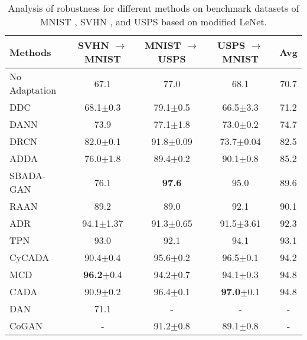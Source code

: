 \documentclass[letterpaper]{article} \usepackage{aaai20}  \usepackage{times}  \usepackage{helvet} \usepackage{courier}  \usepackage[hyphens]{url}  \usepackage{graphicx} \urlstyle{rm} \def\UrlFont{\rm}  \usepackage{graphicx}  \frenchspacing  \setlength{\pdfpagewidth}{8.5in}  \setlength{\pdfpageheight}{11in}
\begin{document}
\begin{table*}
	\caption{Analysis of robustness for different methods on benchmark datasets of MNIST \cite{mnist}, SVHN \cite{svhn}, and USPS \cite{usps} based on modified LeNet.}
	\label{table:results_digits} 
	\begin{center}
		\begin{tabular}{lcccc}
			\hline
			Methods                 & SVHN $\rightarrow$ MNIST & MNIST $\rightarrow$ USPS & USPS $\rightarrow$ MNIST & Avg \\
			\hline
			No Adaptation           & 67.1 & 77.0 & 68.1 & 70.7 \\ 

			DDC \cite{ddc}          & 68.1$\pm$0.3 & 79.1$\pm$0.5 & 66.5$\pm$3.3 & 71.2 \\ 

			DANN \cite{dann}        & 73.9 & 77.1$\pm$1.8 & 73.0$\pm$0.2 & 74.7 \\ 

			DRCN \cite{drcn}        & 82.0$\pm$0.1 & 91.8$\pm$0.09 & 73.7$\pm$0.04 & 82.5 \\ 

			ADDA \cite{adda}        & 76.0$\pm$1.8 & 89.4$\pm$0.2 & 90.1$\pm$0.8 & 85.2 \\ 

			SBADA-GAN \cite{sbada_gan} & 76.1 & \textbf{97.6} & 95.0 & 89.6 \\ 

			RAAN \cite{raan}        & 89.2 & 89.0 & 92.1 & 90.1 \\ 

			ADR \cite{adr}          & 94.1$\pm$1.37 & 91.3$\pm$0.65 & 91.5$\pm$3.61 & 92.3 \\ 

			TPN \cite{tpn}          & 93.0 & 92.1 & 94.1 & 93.1 \\ 

			CyCADA \cite{cycada}    & 90.4$\pm$0.4 & 95.6$\pm$0.2 & 96.5$\pm$0.1 & 94.2 \\ 

			MCD \cite{mcd}          & \textbf{96.2}$\pm$0.4 & 94.2$\pm$0.7 & 94.1$\pm$0.3 & 94.8 \\ 

			CADA \cite{cons_ada}        & 90.9$\pm$0.2 & 96.4$\pm$0.1 & \textbf{97.0}$\pm$0.1 & 94.8 \\ 

			DAN \cite{dan}          & 71.1 & - & - & - \\ 

			CoGAN \cite{cogan}      & - & 91.2$\pm$0.8 & 89.1$\pm$0.8 & - \\ 


\end{tabular}
\end{center}
\end{table*}
\end{document}
